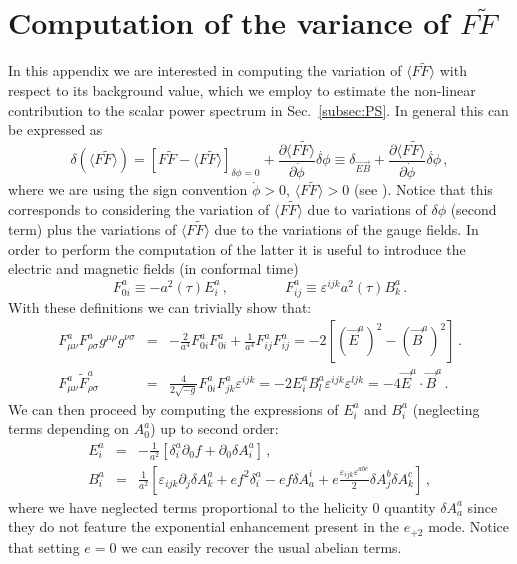 \section{ Computation of the variance of \texorpdfstring{$F \tilde F$}{FFdual} \label{app:variance_computation}}
In this appendix we are interested in computing the variation of $\langle F \tilde F \rangle$ with respect to its background value, which we employ to estimate the non-linear contribution to the scalar power spectrum in Sec.~\ref{subsec:PS}. In general this can be expressed as
\begin{equation}
 \delta (\langle F \tilde F \rangle ) = [F \tilde F - \langle F \tilde F \rangle ]_{\delta \phi = 0} + \frac{\partial \langle F \tilde F \rangle }{\partial \dot \phi} \dot{\delta \phi} \equiv \delta_{\vec{EB}} + \frac{\partial \langle F \tilde F \rangle }{\partial \dot \phi} \dot{\delta \phi} \,,
\end{equation}
where we are using the sign convention $\dot \phi > 0$, $\langle F \tilde F \rangle >  0$ (see \cite{Linde:2012bt}). Notice that this corresponds to considering the variation of $\langle F \tilde F \rangle$ due to variations of $\delta \phi$ (second term) plus the variations of $\langle F \tilde F \rangle$ due to the variations of the gauge fields. In order to perform the computation of the latter it is useful to introduce the electric and magnetic fields (in conformal time)
\begin{equation}
  F^{a}_{0i} \equiv - a^2(\tau) E_{i}^a \, , \qquad \qquad F^{a}_{ij} \equiv \varepsilon^{ijk} a^2(\tau) B_{k}^a \, .
\end{equation}
With these definitions we can trivially show that:
\begin{eqnarray}
  \label{eq:FF_EB}
  F^a_{\mu \nu} F^a_{\rho \sigma} g^{\mu \rho} g^{\nu \sigma } & = & - \frac{2}{a^4} F^a_{0 i} F^a_{0 i} + \frac{1}{a^4} F^a_{i j} F^a_{i j} = - 2 \left[ \left( \vec{E}^a \right)^2 - \left( \vec{B}^a \right)^2 \right] \, . \\
  \label{eq:FFdual_EB}
  F^a_{\mu \nu} \tilde{F}^a_{\rho \sigma} & = & \frac{4}{2 \sqrt{-g}} F^a_{0 i} F^a_{j k} \varepsilon^{ijk} = - 2 E^a_{i} B_{l}^a \varepsilon^{ijk}  \varepsilon^{ljk} = - 4 \vec{E}^a \cdot \vec{B}^a \, .
\end{eqnarray}
We can then proceed by computing the expressions of $E^a_{i}$ and $B^a_{i}$ (neglecting terms depending on $A_0^a$) up to second order:
\begin{eqnarray}
  E^a_{i} & = & - \frac{1}{a^2} \left[\delta^a_i \partial_0 f + \partial_0 \delta A^a_i  \right]\,, \\
  B^a_{i} & = & \frac{1}{ a^2} \left[ \varepsilon_{ijk} \partial_j \delta A^a_k + e f^2 \delta^a_i  - e f \delta A^i_a  +e \frac{\varepsilon_{ijk} \varepsilon^{abc}}{2} \delta A^b_j  \delta A^c_k  \right]\, , 
\end{eqnarray}
where we have neglected terms proportional to the helicity 0 quantity $\delta A^a_a$ since they do not feature the exponential enhancement present in the $e_{+2}$ mode. Notice that setting $e = 0$ we can easily recover the usual abelian terms.\\


